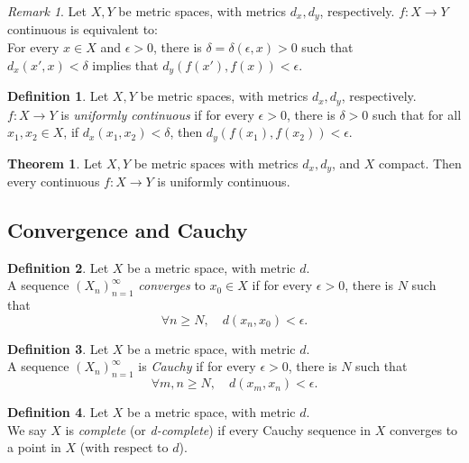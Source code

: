 \documentclass[a5paper]{article}
\theoremstyle{definition}%
\newtheorem{theorem}{Theorem}
\newtheorem*{definition*}{Definition}
\numberwithin{exercise}{section}
\theoremstyle{remark}%
\newtheorem*{remark*}{Remark}
\begin{document}
\begin{remark*}
Let $X,Y$ be metric spaces, with metrics $d_x, d_y$, respectively. $f:X\to Y$ continuous is equivalent to:\\
For every $x\in X$ and $\epsilon>0$, there is $\delta=\delta(\epsilon,x)>0$ such that \\
$d_x(x',x)<\delta$ implies that $d_y(f(x'),f(x))<\epsilon.$
\end{remark*}

\begin{highlight}
\begin{definition*}
Let $X,Y$ be metric spaces, with metrics $d_x, d_y$, respectively. $f:X\to Y$ is \emph{uniformly continuous} if for every $\epsilon>0$, there is $\delta>0$ such that for all $x_1, x_2\in X$, if $d_x(x_1,x_2)<\delta$, then $d_y(f(x_1),f(x_2))<\epsilon$.
\end{definition*}
\end{highlight}

\begin{highlight}
\begin{theorem}
Let $X,Y$ be metric spaces with metrics $d_x, d_y$, and $X$ compact. Then every continuous $f:X\to Y$ is uniformly continuous. 
\end{theorem}
\end{highlight}

\subsection{Convergence and Cauchy}

\begin{highlight}
\begin{definition*}
Let $X$ be a metric space, with metric $d$. \\
A sequence $(X_n)_{n=1}^\infty$ \emph{converges} to $x_0\in X$ if for every $\epsilon>0$, there is $N$ such that 
$$\forall n \geq N, \quad d(x_n, x_0)<\epsilon.$$
\end{definition*}

\begin{definition*}
Let $X$ be a metric space, with metric $d$. \\
A sequence $(X_n)_{n=1}^\infty$ is \emph{Cauchy} if for every $\epsilon>0$, there is $N$ such that 
$$\forall m,n \geq N, \quad d(x_m, x_n)<\epsilon.$$ 
\end{definition*}
\end{highlight}

\begin{highlight}
\begin{definition*}
Let $X$ be a metric space, with metric $d$. \\
We say $X$ is \emph{complete} (or \emph{d-complete}) if every Cauchy sequence in $X$ converges to a point in $X$ (with respect to $d$). 
\end{definition*}
\end{highlight}
\end{document}
